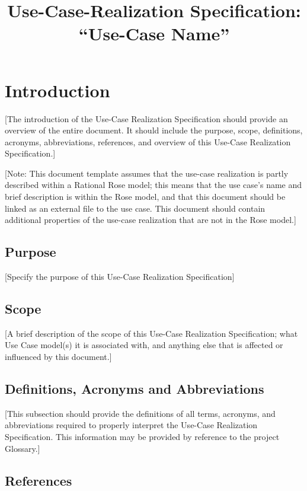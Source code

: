 \documentclass[a4paper,twoside]{article}
\title{Use-Case-Realization Specification: ``Use-Case Name''}
\begin{document}
\maketitle

\section{Introduction}

[The introduction of the Use-Case Realization Specification
should provide an overview of the entire document. It should include the
purpose, scope, definitions, acronyms, abbreviations, references, and overview
of this Use-Case Realization Specification.]

[Note: This document template assumes that the use-case
realization is partly described within a Rational Rose model; this means that
the use case's name and brief description is within the Rose model, and that
this document should be linked as an external file to the use case. This
document should contain additional properties of the use-case realization that
are not in the Rose model.]

\subsection{Purpose}

[Specify the purpose of this Use-Case Realization Specification]

\subsection{Scope}

[A brief description of the scope of this Use-Case
Realization Specification; what Use Case model(s) it is associated with,
and anything else that is affected or influenced by this document.]

\subsection{Definitions, Acronyms and Abbreviations}

[This subsection should provide the definitions of all terms,
acronyms, and abbreviations required to properly interpret the Use-Case
Realization Specification. This information may be provided by
reference to the project Glossary.]

\subsection{References}
\end{document}
